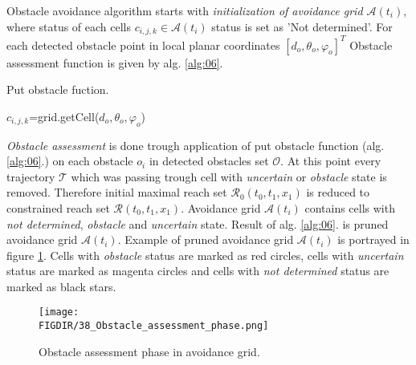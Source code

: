 Obstacle avoidance algorithm starts with \textit{initialization of avoidance grid $\mathscr{A}(t_i)$}, where status of each cells $c_{i,j,k}\in\mathscr{A}(t_i)$ status is set as 'Not determined'. For each detected obstacle point in local planar coordinates  $[d_o,\theta_o,\varphi_o]^T$ Obstacle assessment function is given by alg. \ref{alg:06}.
\\
\begin{algorithm}[H]
    \caption{Put obstacle fuction.}
    \label{alg:06}
    $c_{i,j,k}$=grid.getCell($d_o,\theta_o,\varphi_o$)\;
\end{algorithm}
\noindent\textit{Obstacle assessment} is done trough application of put obstacle function (alg. \ref{alg:06}.) on each obstacle $o_i$ in detected obstacles set $\mathscr{O}$. At this point every trajectory $\mathscr{T}$ which was passing trough cell with \textit{uncertain} or \textit{obstacle} state is removed. Therefore initial maximal reach set $\mathscr{R}_0(t_0,t_1,x_1)$ is reduced to constrained reach set $\mathscr{R}(t_0,t_1,x_1)$. Avoidance grid $\mathscr{A}(t_i)$ contains cells with \textit{not determined}, \textit{obstacle} and \textit{uncertain} state. Result of alg. \ref{alg:06}. is pruned avoidance grid $\mathscr{A}(t_i)$. Example of pruned avoidance grid $\mathscr{A}(t_i)$ is portrayed in figure \ref{fig:gridObstacleAssessment}. Cells with \textit{obstacle} status are marked as red circles, cells with \textit{uncertain} status are marked as magenta circles and cells with \textit{not determined} status are marked as black stars.
\begin{figure}[H]
    \centering
    \texttt{[image: \\FIGDIR/38\_Obstacle\_assessment\_phase.png]}
    \caption{Obstacle assessment phase in avoidance grid.}
    \label{fig:gridObstacleAssessment}
\end{figure}

